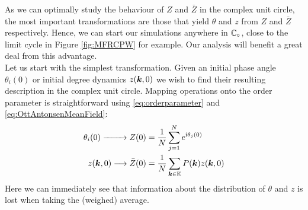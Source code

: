 
As we can optimally study the behaviour of $Z$ and $\bar{Z}$ in the complex unit circle, the most important transformations are those that yield $\theta$ and $z$ from $Z$ and $\bar{Z}$ respectively. Hence, we can start our simulations anywhere in $\mathbb{C}_\circ$, close to the limit cycle in Figure \ref{fig:MFRCPW} for example. Our analysis will benefit a great deal from this advantage. \\



Let us start with the simplest transformation. Given an initial phase angle $\theta_i(0)$ or initial degree dynamics $z({\boldsymbol{k}}, 0)$ we wish to find their resulting description in the complex unit circle. Mapping operations onto the order parameter is straightforward using \eqref{eq:orderparameter} and \eqref{eq:OttAntonsenMeanField}:
\begin{align}
\theta_i(0) \xrightarrow{\hspace*{8mm}} Z(0) &= \frac{1}{N} \sum_{j=1}^N e^{{\rm{i}}\theta_j(0)} \label{eq:thetatoZ}\\
z({\boldsymbol{k}},0) \longrightarrow \bar{Z}(0) &= \frac{1}{N} \sum_{{\boldsymbol{k}} \in {\mathbb{K}}} P({\boldsymbol{k}}) z({\boldsymbol{k}}, 0)  \label{eq:ztoZ}
\end{align}
Here we can immediately see that information about the distribution of $\theta$ and $z$ is lost when taking the (weighed) average. 

